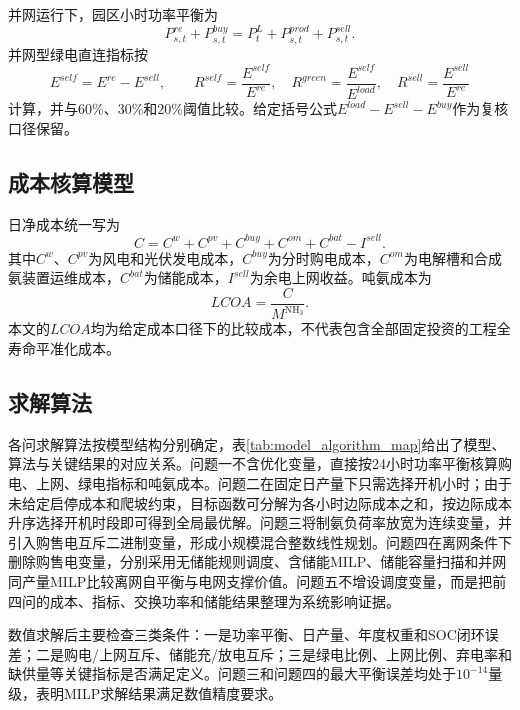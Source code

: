 \documentclass[UTF8,a4paper,12pt]{ctexart}
\newcommand{\NHthree}{\mathrm{NH_3}}
\newcommand{\Rself}{R^{self}}
\newcommand{\Rgreen}{R^{green}}
\newcommand{\Rsell}{R^{sell}}
\begin{document}
并网运行下，园区小时功率平衡为
\[
P^{re}_{s,t}+P^{buy}_{s,t}=P^L_t+P^{prod}_{s,t}+P^{sell}_{s,t}.
\]
并网型绿电直连指标按
\[
E^{self}=E^{re}-E^{sell},\qquad
\Rself=\frac{E^{self}}{E^{re}},\quad
\Rgreen=\frac{E^{self}}{E^{load}},\quad
\Rsell=\frac{E^{sell}}{E^{re}}
\]
计算，并与$60\%$、$30\%$和$20\%$阈值比较。给定括号公式$E^{load}-E^{sell}-E^{buy}$作为复核口径保留。

\subsection{成本核算模型}

日净成本统一写为
\[
C=C^w+C^{pv}+C^{buy}+C^{om}+C^{bat}-I^{sell}.
\]
其中$C^w$、$C^{pv}$为风电和光伏发电成本，$C^{buy}$为分时购电成本，$C^{om}$为电解槽和合成氨装置运维成本，$C^{bat}$为储能成本，$I^{sell}$为余电上网收益。吨氨成本为
\[
LCOA=\frac{C}{M^{\NHthree}}.
\]
本文的$LCOA$均为给定成本口径下的比较成本，不代表包含全部固定投资的工程全寿命平准化成本。

\subsection{求解算法}

各问求解算法按模型结构分别确定，表\ref{tab:model_algorithm_map}给出了模型、算法与关键结果的对应关系。问题一不含优化变量，直接按24小时功率平衡核算购电、上网、绿电指标和吨氨成本。问题二在固定日产量下只需选择开机小时；由于未给定启停成本和爬坡约束，目标函数可分解为各小时边际成本之和，按边际成本升序选择开机时段即可得到全局最优解。问题三将制氨负荷率放宽为连续变量，并引入购售电互斥二进制变量，形成小规模混合整数线性规划。问题四在离网条件下删除购售电变量，分别采用无储能规则调度、含储能MILP、储能容量扫描和并网同产量MILP比较离网自平衡与电网支撑价值。问题五不增设调度变量，而是把前四问的成本、指标、交换功率和储能结果整理为系统影响证据。

数值求解后主要检查三类条件：一是功率平衡、日产量、年度权重和SOC闭环误差；二是购电/上网互斥、储能充/放电互斥；三是绿电比例、上网比例、弃电率和缺供量等关键指标是否满足定义。问题三和问题四的最大平衡误差均处于$10^{-14}$量级，表明MILP求解结果满足数值精度要求。
\end{document}
